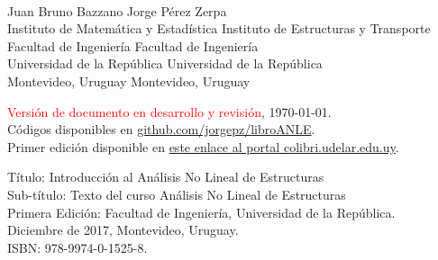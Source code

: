 \documentclass[spanish,twoside,openright,10pt]{book}
\begin{document}
~
\vspace{5mm}
\singlespacing


  \noindent
{\sffamily Juan Bruno Bazzano \hfill Jorge Pérez Zerpa\\
	{\footnotesize 	Instituto de Matemática y Estadística  \hfill Instituto de Estructuras y Transporte\\
		Facultad de Ingeniería \hfill Facultad de Ingeniería\\
		Universidad de la República \hfill Universidad de la República\\
		Montevideo, Uruguay \hfill Montevideo, Uruguay}}\\[0.5cm]


\vspace{20mm}

\noindent
\textcolor{red}{
Versión de documento en desarrollo y revisión}, \today.\\
Códigos disponibles en \href{https://github.com/jorgepz/libroANLE}{github.com/jorgepz/libroANLE}.\\[1cm]

\noindent
Primer edición disponible en 
\href{https://www.colibri.udelar.edu.uy/jspui/bitstream/20.500.12008/22106/1/Bazzano_P%c3%a9rezZerpa_Introducci%c3%b3n_al_An%c3%a1lisis_No_Lineal_de_Estructuras_2017.pdf}{este enlace al portal colibri.udelar.edu.uy}.

\noindent
Título: Introducción al Análisis No Lineal de Estructuras\\
\noindent
Sub-título: Texto del curso Análisis No Lineal de Estructuras\\[-2mm]

\noindent
Primera Edición: Facultad de Ingeniería, Universidad de la República.\\
Diciembre de 2017, Montevideo, Uruguay.\\
ISBN: 978-9974-0-1525-8.\\
\end{document}
